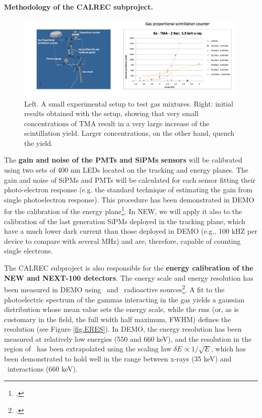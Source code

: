 \paragraph{Methodology of the CALREC subproject.}

\begin{figure}
\begin{center}
\includegraphics[width=0.99\textwidth]{img/TMA.png}
\caption{\small Left. A small experimental setup to test gas mixtures. Right: initial results obtained with the setup, showing that very small concentrations of TMA result in a very large increase of the scintillation yield. Larger concentrations, on the other hand, quench the yield. }
\label{fig:additives}
\end{center}
\end{figure}

The {\bf gain and noise of the PMTs and SiPMs sensors} will be calibrated using two sets of 400 nm LEDs located on the tracking and energy planes. The gain and noise of SiPMs and PMTs will be calculated for each sensor fitting their photo-electron response (e.g. the standard technique of estimating the gain from single photoelectron response). This procedure has been demonstrated in DEMO for the calibration of the energy plane\footcite{Lorca:2014sra}. In NEW, we will apply it also to the calibration of the last generation SiPMs deployed in the tracking plane, which have a much lower dark current than those deployed in DEMO (e.g., 100 kHZ per device to compare with several MHz) and are, therefore, capable of counting single electrons.

The CALREC subproject is also responsible for the {\bf energy calibration of the NEW and NEXT-100 detectors}. The energy scale and energy resolution has been measured in DEMO using \NA\ and \CS\ radioactive sources\footcite{Alvarez:2012nd,Alvarez:2013gxa}. A fit to the photoelectric spectrum of the gammas interacting in the gas yields a gaussian distribution whose mean value sets the energy scale, while the rms (or, as is customary in the field, the full width half maximum, FWHM) defines the resolution (see Figure \ref{fig.ERES}). In DEMO, the energy resolution has been measured at relatively low energies (550 and 660 keV), and the resolution in the region of \Qbb\ has been extrapolated using the scaling law $\delta E \propto 1/\sqrt{E}$, which has been demonstrated to hold well in the range between x-rays (35 keV) and \CS\ interactions (660 keV). 

